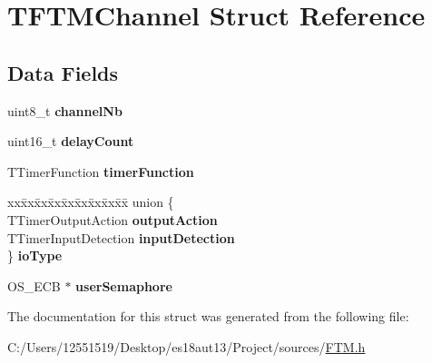 \hypertarget{struct_t_f_t_m_channel}{}\section{T\+F\+T\+M\+Channel Struct Reference}
\label{struct_t_f_t_m_channel}
\subsection*{Data Fields}
\begin{DoxyCompactItemize}
\item 
\hypertarget{struct_t_f_t_m_channel_aa2404895d5318fcd6aecab3147c14826}{}uint8\+\_\+t {\bfseries channel\+Nb}\label{struct_t_f_t_m_channel_aa2404895d5318fcd6aecab3147c14826}

\item 
\hypertarget{struct_t_f_t_m_channel_abb555760e71da6a4822a1ace343381f2}{}uint16\+\_\+t {\bfseries delay\+Count}\label{struct_t_f_t_m_channel_abb555760e71da6a4822a1ace343381f2}

\item 
\hypertarget{struct_t_f_t_m_channel_aa5f3d62a353d779117ced0877fa47734}{}T\+Timer\+Function {\bfseries timer\+Function}\label{struct_t_f_t_m_channel_aa5f3d62a353d779117ced0877fa47734}

\item 
\hypertarget{struct_t_f_t_m_channel_ae805c26feb6a74fbfa4b5bafbb2d6770}{}\begin{tabbing}
xx\=xx\=xx\=xx\=xx\=xx\=xx\=xx\=xx\=\kill
union \{\\
\>TTimerOutputAction {\bfseries outputAction}\\
\>TTimerInputDetection {\bfseries inputDetection}\\
\} {\bfseries ioType}\label{struct_t_f_t_m_channel_ae805c26feb6a74fbfa4b5bafbb2d6770}
\\

\end{tabbing}\item 
\hypertarget{struct_t_f_t_m_channel_aad0abd327f44f55579052e206e0fe3b0}{}O\+S\+\_\+\+E\+C\+B $\ast$ {\bfseries user\+Semaphore}\label{struct_t_f_t_m_channel_aad0abd327f44f55579052e206e0fe3b0}

\end{DoxyCompactItemize}


The documentation for this struct was generated from the following file\+:\begin{DoxyCompactItemize}
\item 
C\+:/\+Users/12551519/\+Desktop/es18aut13/\+Project/sources/\hyperlink{_f_t_m_8h}{F\+T\+M.\+h}\end{DoxyCompactItemize}
